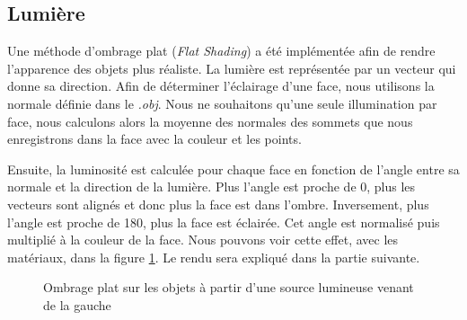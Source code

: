         \subsection{Lumière}
        \label{subsubsec:lumiere}

        Une méthode d'ombrage plat (\textit{Flat Shading}) a été implémentée afin de rendre l'apparence des objets plus réaliste. La lumière est représentée par un vecteur qui donne sa direction. Afin de déterminer l'éclairage d'une face, nous utilisons la normale définie dans le \emph{.obj}. Nous ne souhaitons qu'une seule illumination par face, nous calculons alors la moyenne des normales des sommets que nous enregistrons dans la face avec la couleur et les points. 

        Ensuite, la luminosité est calculée pour chaque face en fonction de l'angle entre sa normale et la direction de la lumière. Plus l'angle est proche de 0\degree, plus les vecteurs sont alignés et donc plus la face est dans l'ombre. Inversement, plus l'angle est proche de 180\degree, plus la face est éclairée. Cet angle est normalisé puis multiplié à la couleur de la face. Nous pouvons voir cette effet, avec les matériaux, dans la figure \ref{fig:lumiere}. Le rendu sera expliqué dans la partie suivante.

        \begin{figure}[h]
            \centering

            \hspace{.005\textwidth}

            \caption{Ombrage plat sur les objets à partir d'une source lumineuse venant de la gauche}
            \label{fig:lumiere}
        \end{figure}

